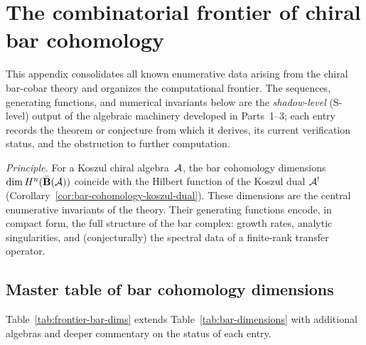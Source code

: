 \chapter[Combinatorial frontier]{The combinatorial frontier of chiral bar cohomology}
\label{app:combinatorial-frontier}


This appendix consolidates all known enumerative data arising from the chiral bar-cobar theory and organizes the computational frontier.  The sequences, generating functions, and numerical invariants below are the \emph{shadow-level} (S-level) output of the algebraic machinery developed in Parts~1--3; each entry records the theorem or conjecture from which it derives, its current verification status, and the obstruction to further computation.

\medskip
\noindent\emph{Principle.}
For a Koszul chiral algebra~$\mathcal{A}$, the bar cohomology dimensions $\dim H^n(\bar{\mathbf{B}}(\mathcal{A}))$ coincide with the Hilbert function of the Koszul dual $\mathcal{A}^!$ (Corollary~\ref{cor:bar-cohomology-koszul-dual}).  These dimensions are the central enumerative invariants of the theory.  Their generating functions encode, in compact form, the full structure of the bar complex: growth rates, analytic singularities, and (conjecturally) the spectral data of a finite-rank transfer operator.

\section{Master table of bar cohomology dimensions}
\label{sec:master-table-frontier}

Table~\ref{tab:frontier-bar-dims} extends Table~\ref{tab:bar-dimensions} with additional algebras and deeper commentary on the status of each entry.

